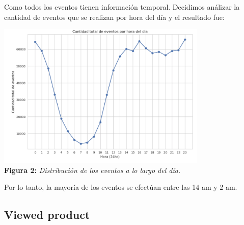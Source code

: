 \documentclass[titlepage,a4paper]{article}
\begin{document}
	Como todos los eventos tienen información temporal. Decidimos análizar la cantidad de eventos que se realizan por hora del día y el resultado fue:
	
	\begin{center}
	\includegraphics[width=10cm]{cantidadDeEventosPorHoraDelDia.jpg}\\
	\textbf{Figura 2:}  \textit{Distribución de los eventos a lo largo del día.}
	\end{center}
	Por lo tanto, la mayoría de los eventos se efectúan entre las 14 am y 2 am. \\
		
	\subsection{Viewed product}
\end{document}
